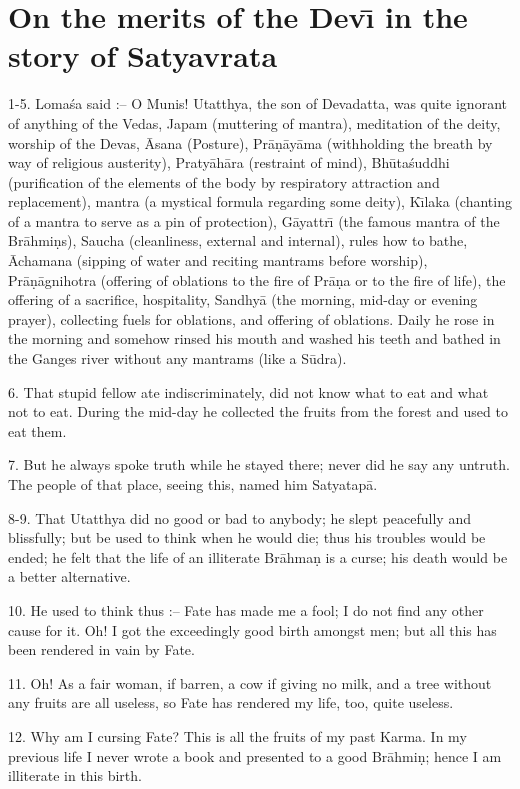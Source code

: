 \chapter{On the merits of the Dev\={\i} in the story of Satyavrata}

1-5. Loma\'sa said :-- O Munis! Utatthya, the son of Devadatta, was quite ignorant of anything of the Vedas, Japam (muttering of mantra), meditation of the deity, worship of the Devas, \=Asana (Posture), Pr\=a\d{n}\=ay\=ama (withholding the breath by way of religious austerity), Praty\=ah\=ara (restraint of mind), Bh\=uta\'suddhi (purification of the elements of the body by respiratory attraction and replacement), mantra (a mystical formula regarding some deity), K\={\i}laka (chanting of a mantra to serve as a pin of protection), G\=ayattr\={\i} (the famous mantra of the Br\=ahmi\d{n}s), Saucha (cleanliness, external and internal), rules how to bathe, \=Achamana (sipping of water and reciting mantrams before worship), Pr\=a\d{n}\=agnihotra (offering of oblations to the fire of Pr\=a\d{n}a or to the fire of life), the offering of a sacrifice, hospitality, Sandhy\=a (the morning, mid-day or evening prayer), collecting fuels for oblations, and offering of oblations. Daily he rose in the morning and somehow rinsed his mouth and washed his teeth and bathed in the Ganges river without any mantrams (like a S\=udra).

6. That stupid fellow ate indiscriminately, did not know what to eat and what not to eat. During the mid-day he collected the fruits from the forest and used to eat them.

7. But he always spoke truth while he stayed there; never did he say any untruth. The people of that place, seeing this, named him Satyatap\=a.

8-9. That Utatthya did no good or bad to anybody; he slept peacefully and blissfully; but be used to think when he would die; thus his troubles would be ended; he felt that the life of an illiterate Br\=ahma\d{n} is a curse; his death would be a better alternative.

10. He used to think thus :-- Fate has made me a fool; I do not find any other cause for it. Oh! I got the exceedingly good birth amongst men; but all this has been rendered in vain by Fate.

11. Oh! As a fair woman, if barren, a cow if giving no milk, and a tree without any fruits are all useless, so Fate has rendered my life, too, quite useless.

12. Why am I cursing Fate? This is all the fruits of my past Karma. In my previous life I never wrote a book and presented to a good Br\=ahmi\d{n}; hence I am illiterate in this birth.

